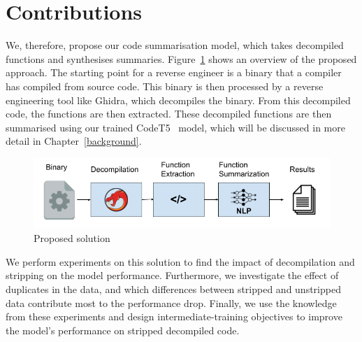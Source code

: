 \section{Contributions}
We, therefore, propose our code summarisation model, which takes decompiled functions and synthesises summaries. Figure~\ref{fig:useCase} shows an overview of the proposed approach. The starting point for a reverse engineer is a binary that a compiler has compiled from source code. This binary is then processed by a reverse engineering tool like Ghidra, which decompiles the binary. From this decompiled code, the functions are then extracted. These decompiled functions are then summarised using our trained CodeT5~\cite{CodeT5} model, which will be discussed in more detail in Chapter~\ref{background}.

\begin{figure}[!tbh]
    \centering
    \includegraphics[width=\textwidth,height=\textheight,keepaspectratio]{img/UseCase.png}
    \caption{Proposed solution}
    \label{fig:useCase}
\end{figure}

We perform experiments on this solution to find the impact of decompilation and stripping on the model performance. Furthermore, we investigate the effect of duplicates in the data, and which differences between stripped and unstripped data contribute most to the performance drop. Finally, we use the knowledge from these experiments and design intermediate-training objectives to improve the model's performance on stripped decompiled code.\\

